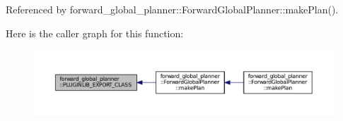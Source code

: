 Referenced by forward\+\_\+global\+\_\+planner\+::\+Forward\+Global\+Planner\+::make\+Plan().



Here is the caller graph for this function\+:
\nopagebreak
\begin{figure}[H]
\begin{center}
\leavevmode
\includegraphics[width=350pt]{namespaceforward__global__planner_a08190a0dc15750553f51ebdf4472398a_icgraph}
\end{center}
\end{figure}


